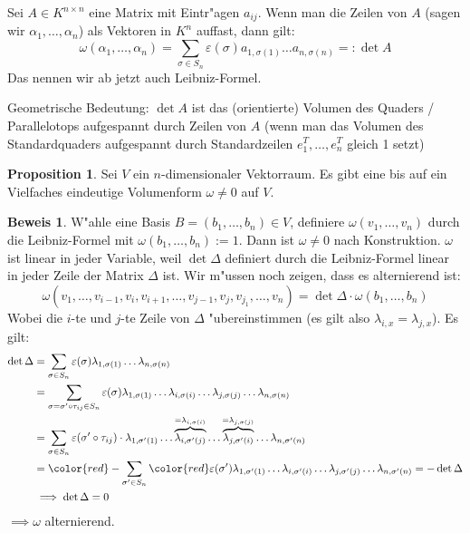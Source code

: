 \documentclass[oneside,fontsize=11pt,paper=a4,BCOR=0mm,DIV=12,automark,headsepline]{scrbook}
\newcommand{\gq}[1]{\glqq{}#1\grqq{}} %
\newcommand{\mcolor}[2][red]{\begingroup\color{#1}#2\endgroup }
\theoremstyle{remark}
\theoremstyle{definition}
\newtheorem*{proposition}{Proposition}
\theoremstyle{definition}
\newtheorem*{prof}{Beweis}
\theoremstyle{remark}
\begin{document}
 \begin{definition}{}{}
 	Sei \(A\in K^{n\times n}\) eine Matrix mit Eintr"agen \(a_{ij}\). Wenn man die Zeilen von \(A\) (sagen wir \(\alpha_1,\dots, \alpha_n\)) als
   Vektoren in \(K^n\) auffast, dann gilt: \[\omega(\alpha_1,\dots,\alpha_n) = \sum_{\sigma\in S_n}{\varepsilon(\sigma)a_{1,\sigma(1)}\dots a_{n,\sigma(n)}} =: \det A \]
   Das nennen wir ab jetzt auch Leibniz-Formel.
 \end{definition}

 \begin{relation}
   Geometrische Bedeutung: \(\det A\) ist das (orientierte) Volumen des Quaders / Parallelotops aufgespannt durch Zeilen von \(A\) (wenn man das Volumen des \gq{Standardquaders} aufgespannt durch Standardzeilen \(e_1^T,\dots,e_n^T\) gleich 1 setzt)
 \end{relation}
\begin{proposition}
	Sei \(V\) ein \(n\)-dimensionaler Vektorraum. Es gibt eine bis auf ein Vielfaches eindeutige Volumenform \(\omega \neq 0\) auf \(V\).
\end{proposition}
\begin{prof}
	W"ahle eine Basis \(B= (b_1,\dots,b_n) \in V\), definiere \(\omega(v_1,\dots,v_n)\) durch die Leibniz-Formel mit \(\omega(b_1,\dots,b_n):=1\). Dann ist \(\omega\neq 0\) nach Konstruktion. \(\omega\) ist linear in jeder Variable, weil \(\det\Delta \) definiert durch die Leibniz-Formel linear in jeder Zeile der Matrix \(\Delta\) ist. Wir m"ussen noch zeigen, dass es alternierend ist: \[\omega(v_1,\dots,v_{i-1},v_i,v_{i+1},\dots,v_{j-1},v_j,v_{j_1},\dots,v_n) = \det\Delta \cdot\omega(b_1,\dots,b_n) \] Wobei die \(i\)-te und \(j\)-te Zeile von \(\Delta\) "ubereinstimmen (es gilt also \(\lambda_{i,x}=\lambda_{j,x}\)). Es gilt:
	\begin{align*}
	\det\Delta &= \sum_{\sigma\in S_n}\varepsilon(\sigma)\lambda_{1,\sigma(1)}\dots\lambda_{n,\sigma(n)} \\
	&= \sum_{\sigma = \sigma'\circ\tau_{ij}\in S_n}\varepsilon(\sigma)\lambda_{1,\sigma(1)}\dots\lambda_{i,\sigma(i)}\dots\lambda_{j,\sigma(j)}\dots\lambda_{n,\sigma(n)} \\
	&= \sum_{\sigma\in S_n}\varepsilon(\sigma'\circ\tau_{ij})\cdot\lambda_{1,\sigma'(1)}\dots\overbrace{\lambda_{i,\sigma'(j)}}^{=\lambda_{i,\sigma(i)}}\dots\overbrace{\lambda_{j,\sigma'(i)}}^{=\lambda_{j,\sigma(j)}}\dots \lambda_{n,\sigma'(n)} \\
	&= \mcolor{-} \sum_{\sigma'\in S_n} \mcolor{\varepsilon(\sigma')} \lambda_{1,\sigma'(1)}\dots\lambda_{i,\sigma'(i)}\dots\lambda_{j,\sigma'(j)}\dots\lambda_{n,\sigma'(n)} = -\det \Delta \\
	&\implies \det \Delta = 0
	\end{align*}
	\(\implies\omega \) alternierend.
\end{prof}
\end{document}
